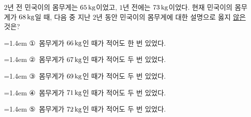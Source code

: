 $2$년 전 민국이의 몸무게는 $65\mkern3mu \mathrm{kg}$이었고, $1$년 전에는 $73\mkern3mu \mathrm{kg}$이었다. 현재 민국이의 몸무게가 $68\mkern3mu \mathrm{kg}$일 때, 다음 중 지난 $2$년 동안 민국이의 몸무게에 대한 설명으로 옳지 \underline{않은} 것은?
\par\medskip\par\noindent\hangindent=1.4em {\small ①}\ 몸무게가 $66\mkern3mu \mathrm{kg}$인 때가 적어도 한 번 있었다.\par\noindent\hangindent=1.4em {\small ②}\ 몸무게가 $67\mkern3mu \mathrm{kg}$인 때가 적어도 두 번 있었다.\par\noindent\hangindent=1.4em {\small ③}\ 몸무게가 $69\mkern3mu \mathrm{kg}$인 때가 적어도 두 번 있었다.\par\noindent\hangindent=1.4em {\small ④}\ 몸무게가 $71\mkern3mu \mathrm{kg}$인 때가 적어도 두 번 있었다.\par\noindent\hangindent=1.4em {\small ⑤}\ 몸무게가 $72\mkern3mu \mathrm{kg}$인 때가 적어도 두 번 있었다.\par\medskip
